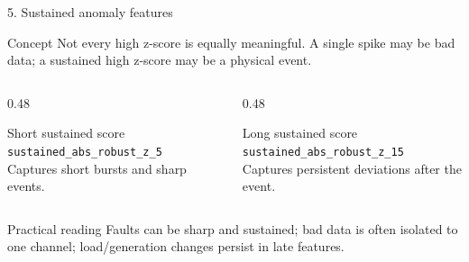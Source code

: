 \documentclass[10pt,aspectratio=169]{beamer}
\newcommand{\code}[1]{\texttt{\footnotesize #1}}
\begin{document}
\begin{frame}{5. Sustained anomaly features}
\small
\begin{block}{Concept}
Not every high z-score is equally meaningful. A single spike may be bad data; a sustained high z-score may be a physical event.
\end{block}
\begin{columns}[T,totalwidth=\textwidth]
\begin{column}{0.48\textwidth}
\begin{exampleblock}{Short sustained score}
\code{sustained\_abs\_robust\_z\_5}\\
Captures short bursts and sharp events.
\end{exampleblock}
\end{column}
\begin{column}{0.48\textwidth}
\begin{exampleblock}{Long sustained score}
\code{sustained\_abs\_robust\_z\_15}\\
Captures persistent deviations after the event.
\end{exampleblock}
\end{column}
\end{columns}
\vspace{2mm}
\begin{alertblock}{Practical reading}
Faults can be sharp and sustained; bad data is often isolated to one channel; load/generation changes persist in late features.
\end{alertblock}
\end{frame}
\end{document}
